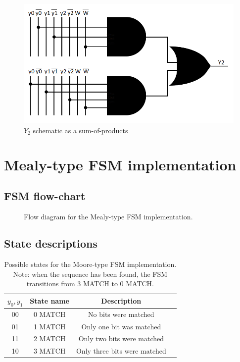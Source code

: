 \documentclass[../../e3_tp3_main.tex]{subfiles}
\begin{document}
\begin{figure}[H]
	\centering
	\includegraphics{figures/ej2_Y2_schem.PNG}
	\caption{$Y_2$ schematic as a sum-of-products}
\end{figure}



\section{Mealy-type FSM implementation}
\subsection{FSM flow-chart}
\begin{figure}[H]
	\centering
	
	\caption{Flow diagram for the Mealy-type FSM implementation.}
\end{figure}


\subsection{State descriptions}
\begin{table}[H]	%
	\centering
		\begin{tabular}{|c|c|c|c|}
		\hline 
		$y_0,y_1$ & State name & Description \\ 
		\hline 
		00 & 0 MATCH & No bits were matched \\ 
		\hline 
		01 & 1 MATCH & Only one bit was matched\\ 
		\hline 
		11 & 2 MATCH & Only two bits were matched\\ 
		\hline 
		10 & 3 MATCH & Only three bits were matched \\ 
		\hline
		\end{tabular} 
	\caption{Possible states for the Moore-type FSM implementation. Note: when the sequence has been found, the FSM transitions from 3 MATCH to 0 MATCH.}
	\label{tab:ej2_mealy_states}
\end{table}
\end{document}
